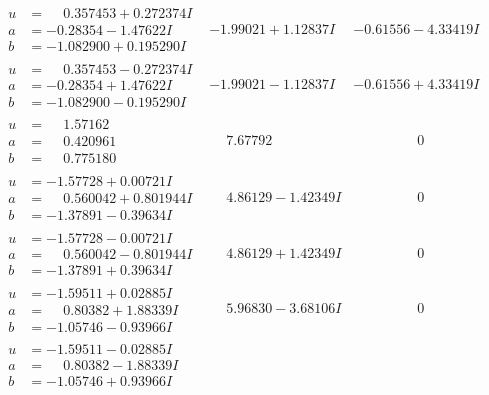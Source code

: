 \documentclass[1p]{elsarticle_modified}
\theoremstyle{definition}
\begin{document}
$$\begin{array}{c|c|c}
\begin{aligned}
u &= \phantom{-}0.357453 + 0.272374 I \\
a &= -0.28354 - 1.47622 I \\
b &= -1.082900 + 0.195290 I\end{aligned}
 & -1.99021 + 1.12837 I & -0.61556 - 4.33419 I \\ \hline\begin{aligned}
u &= \phantom{-}0.357453 - 0.272374 I \\
a &= -0.28354 + 1.47622 I \\
b &= -1.082900 - 0.195290 I\end{aligned}
 & -1.99021 - 1.12837 I & -0.61556 + 4.33419 I \\ \hline\begin{aligned}
u &= \phantom{-}1.57162\phantom{ +0.000000I} \\
a &= \phantom{-}0.420961\phantom{ +0.000000I} \\
b &= \phantom{-}0.775180\phantom{ +0.000000I}\end{aligned}
 & \phantom{-}7.67792\phantom{ +0.000000I} & \phantom{-0.000000 } 0 \\ \hline\begin{aligned}
u &= -1.57728 + 0.00721 I \\
a &= \phantom{-}0.560042 + 0.801944 I \\
b &= -1.37891 - 0.39634 I\end{aligned}
 & \phantom{-}4.86129 - 1.42349 I & \phantom{-0.000000 } 0 \\ \hline\begin{aligned}
u &= -1.57728 - 0.00721 I \\
a &= \phantom{-}0.560042 - 0.801944 I \\
b &= -1.37891 + 0.39634 I\end{aligned}
 & \phantom{-}4.86129 + 1.42349 I & \phantom{-0.000000 } 0 \\ \hline\begin{aligned}
u &= -1.59511 + 0.02885 I \\
a &= \phantom{-}0.80382 + 1.88339 I \\
b &= -1.05746 - 0.93966 I\end{aligned}
 & \phantom{-}5.96830 - 3.68106 I & \phantom{-0.000000 } 0 \\ \hline\begin{aligned}
u &= -1.59511 - 0.02885 I \\
a &= \phantom{-}0.80382 - 1.88339 I \\
b &= -1.05746 + 0.93966 I\end{aligned}

\end{array}$$
\end{document}
